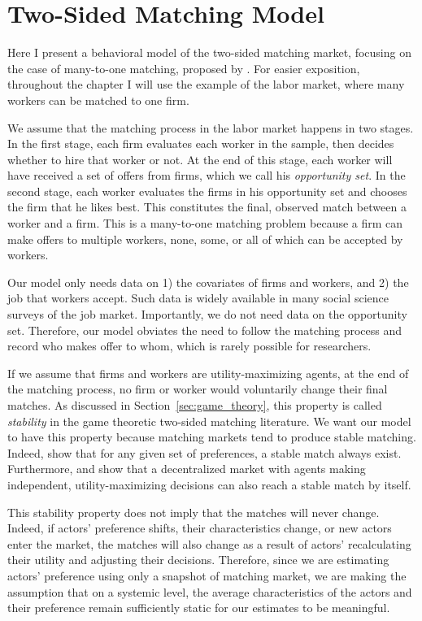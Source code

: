 \chapter{Two-Sided Matching Model}
\label{chap:model}

Here I present a behavioral model of the two-sided matching market, focusing on
the case of many-to-one matching, proposed by \cite{Logan1996}. For easier
exposition, throughout the chapter I will use the example of the labor market,
where many workers can be matched to one firm.

We assume that the matching process in the labor market happens in two stages.
In the first stage, each firm evaluates each worker in the sample, then decides
whether to hire that worker or not. At the end of this stage, each worker will
have received a set of offers from firms, which we call his \textit{opportunity
  set}. In the second stage, each worker evaluates the firms in his opportunity
set and chooses the firm that he likes best. This constitutes the final,
observed match between a worker and a firm. This is a many-to-one matching
problem because a firm can make offers to multiple workers, none, some, or all
of which can be accepted by workers.

Our model only needs data on 1) the covariates of firms and workers, and 2) the
job that workers accept. Such data is widely available in many social science
surveys of the job market. Importantly, we do not need data on the opportunity
set. Therefore, our model obviates the need to follow the matching process and
record who makes offer to whom, which is rarely possible for researchers.

If we assume that firms and workers are utility-maximizing agents, at the end of
the matching process, no firm or worker would voluntarily change their final
matches. As discussed in Section~\ref{sec:game_theory}, this property is called
\textit{stability} in the game theoretic two-sided matching literature. We want
our model to have this property because matching markets tend to produce stable
matching. Indeed, \citet{Roth1992} show that for any given set of preferences, a
stable match always exist. Furthermore, \citet{Roth2016} and \citet{Adachi2003}
show that a decentralized market with agents making independent,
utility-maximizing decisions can also reach a stable match by itself.

This stability property does not imply that the matches will never change.
Indeed, if actors' preference shifts, their characteristics change, or new
actors enter the market, the matches will also change as a result of actors'
recalculating their utility and adjusting their decisions. Therefore, since we
are estimating actors' preference using only a snapshot of matching market, we
are making the assumption that on a systemic level, the average characteristics
of the actors and their preference remain sufficiently static for our estimates
to be meaningful.

